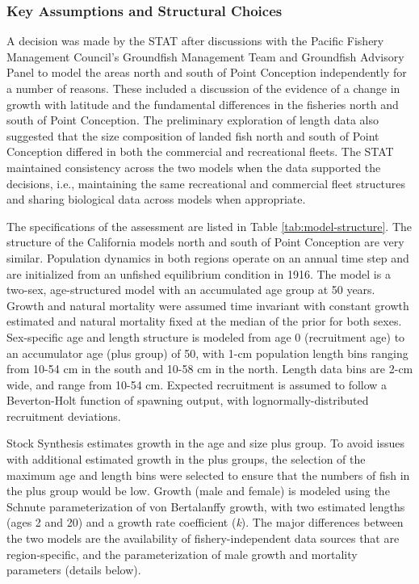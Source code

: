 \documentclass[11pt,
  english,
  letterpaper,
]{article}
\begin{document}
\hypertarget{key-assumptions-and-structural-choices}{%
\subsubsection{Key Assumptions and Structural Choices}\label{key-assumptions-and-structural-choices}}

A decision was made by the STAT after discussions with the Pacific Fishery Management Council's Groundfish Management Team and Groundfish Advisory Panel to model the areas north and south of Point Conception independently for a number of reasons. These included a discussion of the evidence of a change in growth with latitude and the fundamental differences in the fisheries north and south of Point Conception. The preliminary exploration of length data also suggested that the size composition of landed fish north and south of Point Conception differed in both the commercial and recreational fleets. The STAT maintained consistency across the two models when the data supported the decisions, i.e., maintaining the same recreational and commercial fleet structures and sharing biological data across models when appropriate.

The specifications of the assessment are listed in Table \ref{tab:model-structure}. The structure of the California models north and south of Point Conception are very similar. Population dynamics in both regions operate on an annual time step and are initialized from an unfished equilibrium condition in 1916. The model is a two-sex, age-structured model with an accumulated age group at 50 years. Growth and natural mortality were assumed time invariant with constant growth estimated and natural mortality fixed at the median of the prior for both sexes. Sex-specific age and length structure is modeled from age 0 (recruitment age) to an accumulator age (plus group) of 50, with 1-cm population length bins ranging from 10-54 cm in the south and 10-58 cm in the north. Length data bins are 2-cm wide, and range from 10-54 cm. Expected recruitment is assumed to follow a Beverton-Holt function of spawning output, with lognormally-distributed recruitment deviations.

Stock Synthesis estimates growth in the age and size plus group. To avoid issues with additional estimated growth in the plus groups, the selection of the maximum age and length bins were selected to ensure that the numbers of fish in the plus group would be low. Growth (male and female) is modeled using the Schnute parameterization of von Bertalanffy growth, with two estimated lengths (ages 2 and 20) and a growth rate coefficient (\emph{k}). The major differences between the two models are the availability of fishery-independent data sources that are region-specific, and the parameterization of male growth and mortality parameters (details below).
\end{document}
